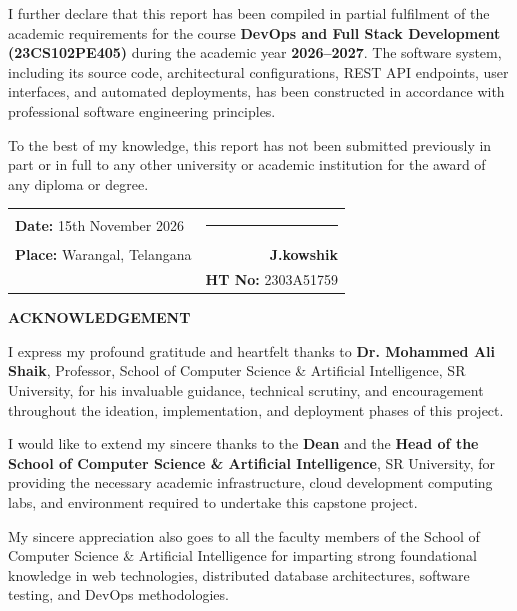 \vspace{0.4cm}
\noindent I further declare that this report has been compiled in partial fulfilment of the academic requirements for the course \textbf{DevOps and Full Stack Development (23CS102PE405)} during the academic year \textbf{2026--2027}. The software system, including its source code, architectural configurations, REST API endpoints, user interfaces, and automated deployments, has been constructed in accordance with professional software engineering principles.

\vspace{0.4cm}
\noindent To the best of my knowledge, this report has not been submitted previously in part or in full to any other university or academic institution for the award of any diploma or degree.

\vspace{2.5cm}
\noindent
\begin{tabular*}{\textwidth}{@{\extracolsep{\fill}}lr}
    \textbf{Date:} 15th November 2026 & \rule{5cm}{0.8pt} \\
    \textbf{Place:} Warangal, Telangana & \textbf{J.kowshik} \\
    & \textbf{HT No:} 2303A51759
\end{tabular*}

\newpage
\thispagestyle{plain}
\begin{center}
    {\fontsize{16}{20}\selectfont \textbf{ACKNOWLEDGEMENT}}\\[0.6cm]
\end{center}

\noindent I express my profound gratitude and heartfelt thanks to \textbf{Dr. Mohammed Ali Shaik}, Professor, School of Computer Science \& Artificial Intelligence, SR University, for his invaluable guidance, technical scrutiny, and encouragement throughout the ideation, implementation, and deployment phases of this project.

\vspace{0.4cm}
\noindent I would like to extend my sincere thanks to the \textbf{Dean} and the \textbf{Head of the School of Computer Science \& Artificial Intelligence}, SR University, for providing the necessary academic infrastructure, cloud development computing labs, and environment required to undertake this capstone project.

\vspace{0.4cm}
\noindent My sincere appreciation also goes to all the faculty members of the School of Computer Science \& Artificial Intelligence for imparting strong foundational knowledge in web technologies, distributed database architectures, software testing, and DevOps methodologies.

